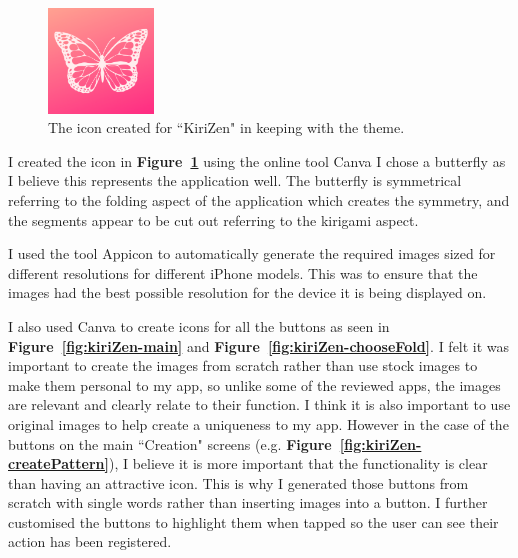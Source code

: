 \documentclass[11pt]{article}
\begin{document}
                \paragraph{}

        \begin{figure}
                        \centering
                        \includegraphics[width=0.25\textwidth]{KiriZen/icon}
                        \caption{The icon created for ``KiriZen" in keeping with the theme.}
                        \label{fig:icon}
                    \end{figure}
            I created the icon in \textbf{Figure~\ref{fig:icon}} using the online tool Canva \cite{Canva} I chose a butterfly as I believe this represents the application well. The butterfly is symmetrical referring to the folding aspect of the application which creates the symmetry, and the segments appear to be cut out referring to the kirigami aspect.
            
            I used the tool Appicon \cite{Appicon} to automatically generate the required images sized for different resolutions for different iPhone models. This was to ensure that the images had the best possible resolution for the device it is being displayed on.
        
            I also used Canva to create icons for all the buttons as  seen in \textbf{Figure~\ref{fig:kiriZen-main}} and \textbf{Figure~\ref{fig:kiriZen-chooseFold}}. I felt it was important to create the images from scratch rather than use stock images to make them personal to my app, so unlike some of the reviewed apps, the images are relevant and clearly relate to their function. I think it is also important to use original images to help create a uniqueness to my app. However in the case of the buttons on the main ``Creation" screens (e.g. \textbf{Figure~\ref{fig:kiriZen-createPattern}}), I believe it is more important that the functionality is clear than having an attractive icon. This is why I generated those buttons from scratch with single words rather than inserting images into a button. I further customised the buttons to highlight them when tapped so the user can see their action has been registered.
            
\end{document}
